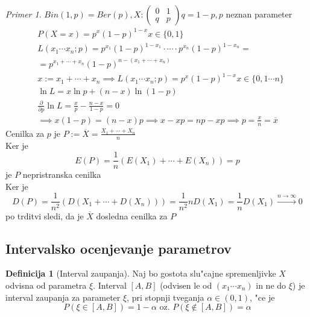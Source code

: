 \documentclass[a4paper,12pt]{article}
\theoremstyle{definition}
\newtheorem{defn}[counter]{Definicija}
\theoremstyle{remark}
\newtheorem*{ex}{Primer}
\begin{document}
\begin{ex}
    $Bin(1,p) = Ber(p), X: \begin{pmatrix}0 & 1 \\ q & p\end{pmatrix} q = 1-p, p$ neznan parameter
    \begin{align*}
        &P(X=x) = p^x (1-p)^{1-x} x \in \{0, 1\} \\
        &L(x_1 \cdots x_n; p) = p^{x_1} (1-p)^{1-x_1} \cdot \cdots \cdot p^{x_n} (1-p)^{1-x_n} = \\
        &= p^{x_1 + \cdots + x_n} (1-p)^{n - (x_1 + \cdots + x_n)} \\
        &x := x_1 + \cdots + x_n \implies L(x_1 \cdots x_n; p) = p^x (1-p)^{1-x} x \in \{0, 1 \cdots n\} \\
        &\ln L = x \ln p + (n-x) \ln(1-p) \\
        &\frac{\partial}{\partial p} \ln L = \frac{x}{p} - \frac{n-x}{1-p} = 0 \\
        &\implies x(1-p) = (n-x)p \implies x - xp = np - xp \implies p = \frac{x}{n} = \overline{x}
    \end{align*}
    Cenilka za $p$ je $P := \overline{X} = \frac{X_1 + \cdots + X_n}{n}$ \\
    Ker je
    \begin{equation*}
        E(P) = \frac{1}{n} (E(X_1) + \cdots + E(X_n)) = p
    \end{equation*}
    je $P$ nepristranska cenilka \\
    Ker je
    \begin{equation*}
        D(P) = \frac{1}{n^2} (D(X_1 + \cdots + D(X_n))) = \frac{1}{n^2} n D(X_1) =
        \frac{1}{n} D(X_1) \stackrel{n \to \infty}{\to} 0
    \end{equation*}
    po trditvi sledi, da je $\overline{X}$ dosledna cenilka za $P$
\end{ex}

\subsection{Intervalsko ocenjevanje parametrov}

\begin{defn}[Interval zaupanja]
    Naj bo gostota slu"cajne spremenljivke $X$ odvisna od parametra $\xi$. Interval $[A,B]$ (odvisen le od
    $(x_1 \cdots x_n)$ in ne do $\xi$) je interval zaupanja za parameter $\xi$, pri stopnji tveganja
    $\alpha \in (0,1)$, "ce je
    \begin{equation*}
        P(\xi \in [A,B]) = 1-\alpha \text{ oz. } P(\xi \notin [A,B]) = \alpha
    \end{equation*}
\end{defn}
\end{document}
